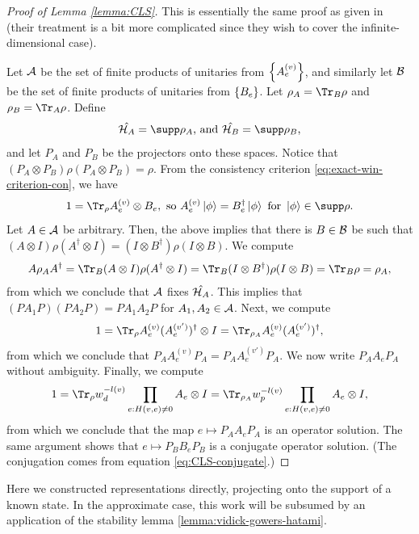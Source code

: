 \begin{proof}[Proof of Lemma \ref{lemma:CLS}]
	This is essentially the same proof as given in \cite{cleve2016perfect} (their treatment is a bit more complicated since they wish to cover the infinite-dimensional case).

	Let $\mathcal A$ be the set of finite products of unitaries from $\left\{A_e^{(v)}\right\}$, and similarly let $\mathcal B$ be the set of finite products of unitaries from $\left\{B_e\right\}$. 
	Let $\rho_A = \Tr_B \rho$ and $\rho_B = \Tr_A\rho$. Define 
	\begin{equation}
		\hat{\m H_A} = \supp\rho_A\text{, and }
		\hat{\m H_B} = \supp\rho_B\text,
	\end{equation}
	and let $P_A$ and $P_B$ be the projectors onto these spaces. Notice that $(P_A\otimes P_B) \rho (P_A\otimes P_B) = \rho$. From the consistency criterion \eqref{eq:exact-win-criterion-con}, we have
	\begin{equation}\label{eq:CLS-conjugate}
		1 	= \Tr_\rho A_e^{(v)}\otimes B_e,\text{ so } A_e^{(v)}\ket\phi = B_e^\dagger\ket\phi\text{ for }\ket\phi\in\supp\rho.
	\end{equation}
	Let $A\in \mathcal A$ be arbitrary. Then, the above implies that there is $B\in \mathcal B$ be such that $(A\otimes I) \rho (A^\dagger\otimes I) = (I\otimes B^\dagger)\rho(I\otimes B)$. We compute
	\begin{align}
		A\rho_AA^\dagger
		= \Tr_B (A\otimes I)\rho(A^\dagger\otimes I)
		= \Tr_B (I\otimes B^\dagger)\rho(I\otimes B)
		= \Tr_B \rho
		=\rho_A,
	\end{align}
	from which we conclude that $\mathcal A$ fixes $\hat{\mathcal H_A}$. This implies that $(PA_1P)(PA_2P) = PA_1A_2P$ for $A_1,A_2\in \mathcal A$. 
	Next, we compute
	\begin{equation}
		1 = \Tr_\rho A_e^{(v)}(A_e^{(v')})^\dagger \otimes I
		= \Tr_{\rho_A} A_e^{(v)}(A_e^{(v')})^\dagger,
	\end{equation}
	from which we conclude that $P_AA_e^{(v)}P_A=P_AA_e^{(v')}P_A$. We now write $P_AA_eP_A$ without ambiguity. Finally, we compute
	\begin{align}
		1 = \Tr_\rho w_d^{-l(v)}\prod_{e:H(v,e)\neq 0} A_e\otimes I = \Tr_{\rho_A} w_p^{-l(v)}\prod_{e:H(v,e)\neq 0} A_e\otimes I,
	\end{align}
	from which we conclude that the map $e\mapsto P_AA_eP_A$ is an operator solution. The same argument shows that $e\mapsto P_BB_eP_B$ is a conjugate operator solution. (The conjugation comes from equation \eqref{eq:CLS-conjugate}.)

\end{proof}
Here we constructed representations directly, projecting onto the support of a known state. In the approximate case, this work will be subsumed by an application of the stability lemma \ref{lemma:vidick-gowers-hatami}.


